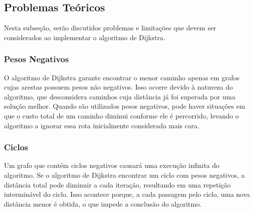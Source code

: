 \documentclass[12pt]{article}
\begin{document}
\newpage

\subsection{Problemas Teóricos}

Nesta subseção, serão discutidos problemas e limitações que devem ser considerados ao implementar o algoritmo de Dijkstra.

\subsubsection{Pesos Negativos}
O algoritmo de Dijkstra garante encontrar o menor caminho apenas em grafos cujas arestas possuem pesos não negativos. Isso ocorre devido à natureza do algoritmo, que desconsidera caminhos cuja distância já foi superada por uma solução melhor. Quando são utilizados pesos negativos, pode haver situações em que o custo total de um caminho diminui conforme ele é percorrido, levando o algoritmo a ignorar essa rota inicialmente considerada mais cara.

\subsubsection{Ciclos}
Um grafo que contém ciclos negativos causará uma execução infinita do algoritmo. Se o algoritmo de Dijkstra encontrar um ciclo com pesos negativos, a distância total pode diminuir a cada iteração, resultando em uma repetição interminável do ciclo. Isso acontece porque, a cada passagem pelo ciclo, uma nova distância menor é obtida, o que impede a conclusão do algoritmo.

% 
% 
\end{document}
